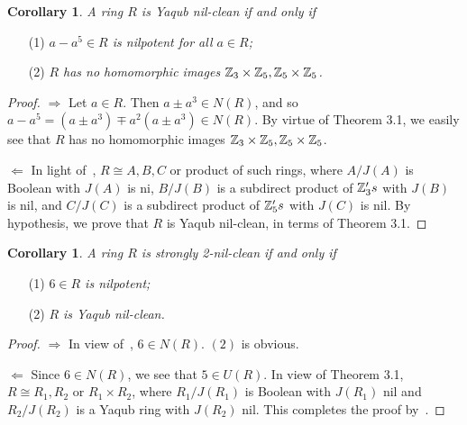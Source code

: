 \documentclass[12pt, reqno]{amsart}
\newtheorem{cor}[thm]{Corollary}
\numberwithin{equation}{section}
\begin{document}
\begin{cor} A ring $R$ is Yaqub nil-clean if and only if
\end{cor}
\begin{enumerate}
\item [(1)] {\it $a-a^5\in R$ is nilpotent for all $a\in R$;}
\vspace{-.5mm}
\item [(2)] {\it $R$ has no homomorphic images ${\Bbb Z}_3\times {\Bbb Z}_5, {\Bbb Z}_5\times {\Bbb Z}_5$.}
\end{enumerate}
\begin{proof} $\Longrightarrow$ Let $a\in R$. Then $a\pm a^3\in N(R)$, and so $a-a^5=(a\pm a^3)\mp a^2(a\pm a^3)\in N(R)$. By virtue of Theorem 3.1, we easily see that $R$ has no homomorphic images ${\Bbb Z}_3\times {\Bbb Z}_5, {\Bbb Z}_5\times {\Bbb Z}_5$.

$\Longleftarrow $ In light of~\cite[Theorem 2.1]{Z}, $R\cong A,B,C$ or product of such rings, where $A/J(A)$ is Boolean with $J(A)$ is ni, $B/J(B)$ is a subdirect product of ${\Bbb Z}_3's$ with $J(B)$ is nil, and $C/J(C)$ is a subdirect product of ${\Bbb Z}_5's$ with $J(C)$ is nil. By hypothesis,
we prove that $R$ is Yaqub nil-clean, in terms of Theorem 3.1.\end{proof}

\begin{cor} A ring $R$ is strongly 2-nil-clean if and only if
\end{cor}
\begin{enumerate}
\item [(1)] {\it $6\in R$ is nilpotent;}
\vspace{-.5mm}
\item [(2)] {\it $R$ is Yaqub nil-clean.}
\end{enumerate}
\begin{proof} $\Longrightarrow$ In view of~\cite[Theorem 3.6]{CS}, $6\in N(R)$. $(2)$ is obvious.

$\Longleftarrow$ Since $6\in N(R)$, we see that $5\in U(R)$. In view of Theorem 3.1,  $R\cong R_1, R_2$ or $R_1\times R_2$, where
$R_1/J(R_1)$ is Boolean with $J(R_1)$ nil and $R_2/J(R_2)$ is a Yaqub ring with $J(R_2)$ nil. This completes the proof by~\cite[Theorem 4.5]{CS}.\end{proof}
\end{document}
